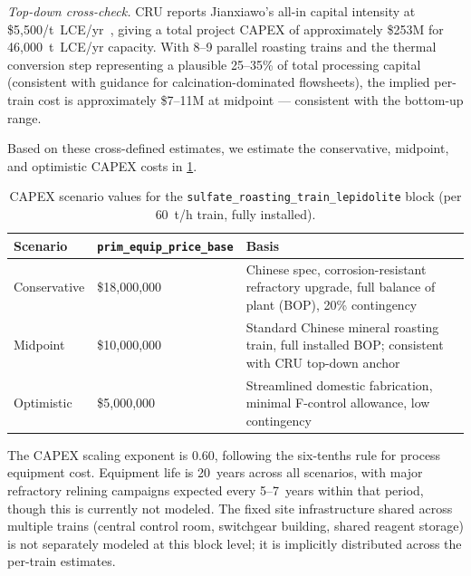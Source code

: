 \textit{Top-down cross-check.} CRU reports Jianxiawo's all-in capital intensity at \$5,500/t~LCE/yr~\cite{zhangChinaHasDomestic2025}, giving a total project CAPEX of approximately \$253M for 46,000~t~LCE/yr capacity. With 8--9 parallel roasting trains and the thermal conversion step representing a plausible 25--35\% of total processing capital (consistent with \citet{petersPlantDesignEconomics1991} guidance for calcination-dominated flowsheets), the implied per-train cost is approximately \$7--11M at midpoint --- consistent with the bottom-up range.

Based on these cross-defined estimates, we estimate the conservative, midpoint, and optimistic CAPEX costs in \ref{tab:c-sulfateroastingtrainlepidolite-capex}.
 
\begin{table}[h!]
\caption[CAPEX scenario values for the \texttt{sulfate\_roasting\_train\_lepidolite} block.]{CAPEX scenario values for the \texttt{sulfate\_roasting\_train\_lepidolite} block (per 60~t/h train, fully installed).}
\label{tab:c-sulfateroastingtrainlepidolite-capex}

\begin{tabular}{>{\raggedright\arraybackslash}p{2.5cm}
                >{\raggedright\arraybackslash}p{4.3cm}
                >{\raggedright\arraybackslash}p{8.5cm}}
\toprule
\textbf{Scenario} & \texttt{prim\_equip\_price\_base} & \textbf{Basis} \\
\midrule
Conservative & \$18,000,000  & Chinese spec, corrosion-resistant refractory upgrade, full balance of plant (BOP), 20\% contingency \\
Midpoint     & \$10,000,000 & Standard Chinese mineral roasting train, full installed BOP; consistent with CRU top-down anchor \\
Optimistic   & \$5,000,000  & Streamlined domestic fabrication, minimal F-control allowance, low contingency \\
\bottomrule
\end{tabular}
\end{table}

\noindent The CAPEX scaling exponent is 0.60, following the six-tenths rule for process equipment cost. Equipment life is 20~years across all scenarios, with major refractory relining campaigns expected every 5--7~years within that period, though this is currently not modeled. The fixed site infrastructure shared across multiple trains (central control room, switchgear building, shared reagent storage) is not separately modeled at this block level; it is implicitly distributed across the per-train estimates.

